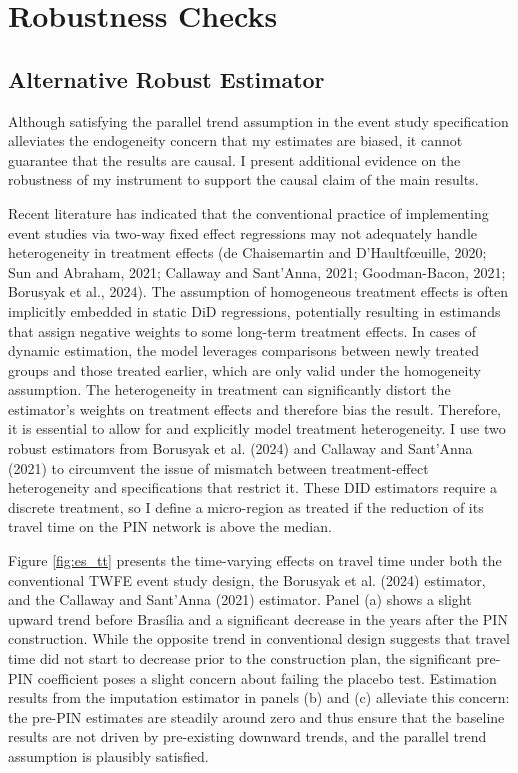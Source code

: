 \documentclass[11pt]{article}
\begin{document}
\section{Robustness Checks}

\subsection{Alternative Robust Estimator}
Although satisfying the parallel trend assumption in the event study specification alleviates the endogeneity concern that my estimates are biased, it cannot guarantee that the results are causal. I present additional evidence on the robustness of my instrument to support the causal claim of the main results.

Recent literature has indicated that the conventional practice of implementing event studies via two-way fixed effect regressions may not adequately handle heterogeneity in treatment effects (de Chaisemartin and D’Haultfœuille, 2020; Sun and Abraham, 2021; Callaway and Sant’Anna, 2021; Goodman-Bacon, 2021; Borusyak et al., 2024). The assumption of homogeneous treatment effects is often implicitly embedded in static DiD regressions, potentially resulting in estimands that assign negative weights to some long-term treatment effects. In cases of dynamic estimation, the model leverages comparisons between newly treated groups and those treated earlier, which are only valid under the homogeneity assumption. The heterogeneity in treatment can significantly distort the estimator’s weights on treatment effects and therefore bias the result. Therefore, it is essential to allow for and explicitly model treatment heterogeneity. I use two robust estimators from Borusyak et al. (2024) and Callaway and Sant'Anna (2021) to circumvent the issue of mismatch between treatment-effect heterogeneity and specifications that restrict it. These DID estimators require a discrete treatment, so I define a micro-region as treated if the reduction of its travel time on the PIN network is above the median.

Figure \ref{fig:es_tt} presents the time-varying effects on travel time under both the conventional TWFE event study design, the Borusyak et al. (2024) estimator, and the Callaway and Sant'Anna (2021) estimator. Panel (a) shows a slight upward trend before Brasília and a significant decrease in the years after the PIN construction. While the opposite trend in conventional design suggests that travel time did not start to decrease prior to the construction plan, the significant pre-PIN coefficient poses a slight concern about failing the placebo test. Estimation results from the imputation estimator in panels (b) and (c) alleviate this concern: the pre-PIN estimates are steadily around zero and thus ensure that the baseline results are not driven by pre-existing downward trends, and the parallel trend assumption is plausibly satisfied.
\end{document}
